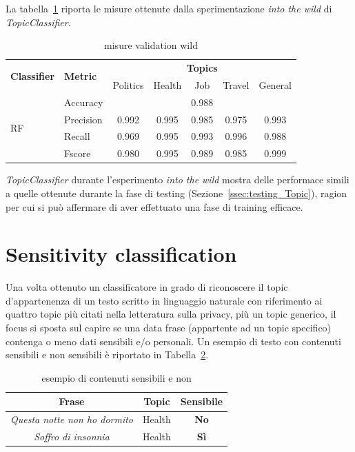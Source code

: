 La tabella~\ref{tbl:testing_wild} riporta le misure ottenute dalla sperimentazione \textit{into the wild} di \textit{TopicClassifier}. 
\begin{table}[h]
\begin{tabular}{|l|l|c|c|c|c|c|}
\hline
\multirow{2}{*}{\textbf{Classifier}} & \multirow{2}{*}{\textbf{Metric}} & \multicolumn{5}{c|}{\textbf{Topics}} \\ \cline{3-7} 
 &  & Politics & Health & Job & Travel & General \\ \hline
\multirow{4}{*}{RF} & Accuracy & \multicolumn{5}{c|}{0.988} \\ \cline{2-7} 
 & Precision & 0.992 & 0.995 & 0.985 & 0.975 & 0.993 \\ \cline{2-7} 
 & Recall & 0.969 & 0.995 & 0.993 & 0.996 & 0.988 \\ \cline{2-7} 
 & Fscore & 0.980 & 0.995 & 0.989 & 0.985 & 0.999 \\ \hline
\end{tabular}
\caption{misure validation wild}
\label{tbl:testing_wild}
\end{table}
\FloatBarrier
\textit{TopicClassifier} durante l'esperimento \textit{into the wild} mostra delle performace simili a quelle ottenute durante la fase di testing (Sezione~\ref{ssec:testing_Topic}), ragion per cui si può affermare di aver effettuato una fase di training efficace.

\section{Sensitivity classification}
\label{sec:sensclass}
Una volta ottenuto un classificatore in grado di riconoscere il topic d'appartenenza di un testo scritto in linguaggio naturale con riferimento ai quattro topic più citati nella letteratura sulla privacy, più un topic generico, il focus si sposta sul capire se una data frase (appartente ad un topic specifico) contenga o meno dati sensibili e/o personali. Un esempio di testo con contenuti sensibili e non sensibili è riportato in Tabella~\ref{tbl:example_sens}.

\begin{table}[h]
\label{tbl:example_sens}
\centering
\begin{tabular}{c|c|c}
\hline
\textbf{Frase} & \textbf{Topic} & \textbf{Sensibile} \\ \hline
\textit{Questa notte non ho dormito} & Health & \textbf{No} \\ \hline
\textit{Soffro di insonnia} & Health & \textbf{Sì} \\ \hline
\end{tabular}
\caption{esempio di contenuti sensibili e non}
\end{table}
\FloatBarrier

